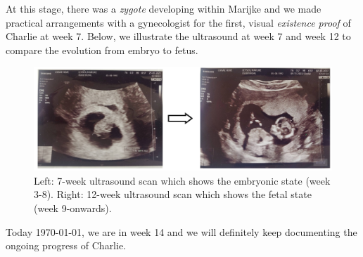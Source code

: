 \documentclass{article} %
\begin{document}
At this stage, there was a \textit{zygote} developing within Marijke and we made practical arrangements with a gynecologist for the first, visual \textit{existence proof} of Charlie at week 7.
Below, we illustrate the ultrasound at week 7 and week 12 to compare the evolution from embryo to fetus.    

\begin{figure}[h]
    \centering
    \includegraphics[width=0.5\linewidth]{./images/Charlie-progress.jpg} 
    \caption{Left: 7-week ultrasound scan which shows the embryonic state (week 3-8). 
    Right: 12-week ultrasound scan which shows the fetal state (week 9-onwards).}
    \label{fig:progress}
\end{figure}

Today \today, we are in week 14 and we will definitely keep documenting the ongoing progress of Charlie.




\end{document}
